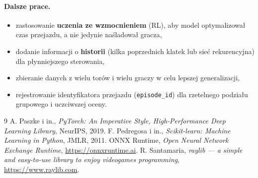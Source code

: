\documentclass[11pt,a4paper]{article}
\begin{document}
\paragraph{Dalsze prace.}
\begin{itemize}[noitemsep]
  \item zastosowanie \textbf{uczenia ze wzmocnieniem} (RL), aby model optymalizował
        czas przejazdu, a nie jedynie naśladował gracza,
  \item dodanie informacji o \textbf{historii} (kilka poprzednich klatek lub sieć
        rekurencyjna) dla płynniejszego sterowania,
  \item zbieranie danych z wielu torów i wielu graczy w celu lepszej generalizacji,
  \item rejestrowanie identyfikatora przejazdu (\texttt{episode\_id}) dla rzetelnego
        podziału grupowego i uczciwszej oceny.
\end{itemize}

\begin{thebibliography}{9}
 A. Paszke i in., \emph{PyTorch: An Imperative Style,
High-Performance Deep Learning Library}, NeurIPS, 2019.
 F. Pedregosa i in., \emph{Scikit-learn: Machine Learning in
Python}, JMLR, 2011.
 ONNX Runtime, \emph{Open Neural Network Exchange Runtime},
\url{https://onnxruntime.ai}.
 R. Santamaria, \emph{raylib --- a simple and easy-to-use library
to enjoy videogames programming}, \url{https://www.raylib.com}.
\end{thebibliography}
\end{document}
